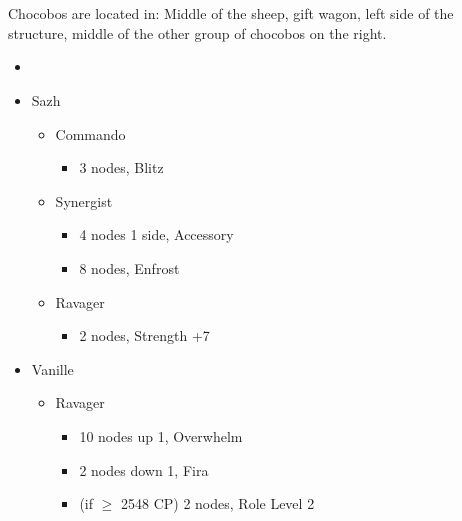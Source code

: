 \chapter[Chapter 8]{}

\begin{multicols}{2}
Chocobos are located in: Middle of the sheep, gift wagon, left side of the structure, middle of the other group of chocobos on the right. 
\begin{menu}
\begin{itemize}
    \paradigm
    \begin{itemize}
        \item {}%
{\paradigmline[1]{\textit{\com}}{\textit{\rav}}{}}%
{\paradigmline{(\com)}{(\med)}{}}%
{\paradigmline{\syn}{\sab}{}}%
{\paradigmline{\rav}{\rav}{}}%
{\paradigmline{\rav}{\sab}{}}%
{\paradigmline{\com}{\sab}{}}
    \end{itemize}
    \crystarium
    \begin{itemize}
        \item Sazh
        \begin{itemize}
            \item Commando
            \begin{itemize}
                \item 3 nodes, Blitz
            \end{itemize}
            \item Synergist
            \begin{itemize}
                \item 4 nodes 1 side, Accessory
                \item 8 nodes, Enfrost
            \end{itemize}
            \item Ravager
            \begin{itemize}
                \item 2 nodes, Strength +7
            \end{itemize}
        \end{itemize}
        \item Vanille
        \begin{itemize}
            \item Ravager
            \begin{itemize}
                \item 10 nodes up 1, Overwhelm
                \item 2 nodes down 1, Fira
                \item (if $\ge$ 2548 CP) 2 nodes, Role Level 2

\end{itemize}
\end{itemize}
\end{itemize}
\end{itemize}
\end{menu}
\end{multicols}
